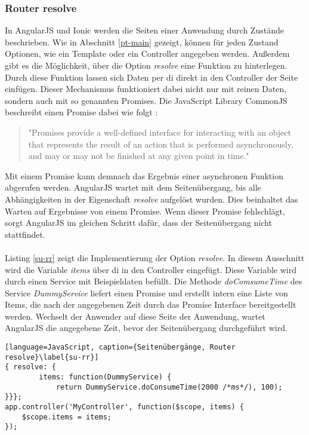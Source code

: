 \subsubsection{Router resolve}
\label{dd-router-resolve}
In AngularJS und Ionic werden die Seiten einer Anwendung durch Zustände beschrieben. Wie in Abschnitt \ref{pt-main} gezeigt, können für jeden Zustand Optionen, wie ein \gls{Template} oder ein Controller angegeben werden. Außerdem gibt es die Möglichkeit, über die Option \emph{resolve} eine Funktion zu hinterlegen. Durch diese Funktion lassen sich Daten per \gls{di} direkt in den Controller der Seite einfügen. Dieser Mechanismus funktioniert dabei nicht nur mit reinen Daten, sondern auch mit so genannten \glspl{Promise}. Die JavaScript Library CommonJS beschreibt einen Promise dabei wie folgt \cite{CommonJSPromises}:
\begin{quote}
"Promises provide a well-defined interface for interacting with an object that represents the result of an action that is performed asynchronously, and may or may not be finished at any given point in time."
\end{quote}
Mit einem \gls{Promise} kann demnach das Ergebnis einer asynchronen Funktion abgerufen werden. AngularJS wartet mit dem Seitenübergang, bis alle Abhängigkeiten in der Eigenschaft \emph{resolve} aufgelöst wurden. Dies beinhaltet das Warten auf Ergebnisse von einem \gls{Promise}. Wenn dieser \gls{Promise} fehlschlägt, sorgt AngularJS im gleichen Schritt dafür, dass der Seitenübergang nicht stattfindet. 
\\\\
Listing \ref{su-rr} zeigt die Implementierung der Option \emph{resolve}. In diesem Ausschnitt wird die Variable \emph{items} über \gls{di} in den Controller eingefügt. Diese Variable wird durch einen Service mit Beispieldaten befüllt. Die Methode \emph{doComsumeTime} des Service \emph{DummyService} liefert einen Promise und erstellt intern eine Liste von Items, die nach der angegebenen Zeit durch das \gls{Promise} Interface bereitgestellt werden. Wechselt der Anwender auf diese Seite der Anwendung, wartet AngularJS die angegebene Zeit, bevor der Seitenübergang durchgeführt wird.
\begin{lstlisting}[language=JavaScript, caption={Seitenübergänge, Router resolve}\label{su-rr}]
{ resolve: {
		items: function(DummyService) {
			return DummyService.doConsumeTime(2000 /*ms*/), 100);
}}};
app.controller('MyController', function($scope, items) {
	$scope.items = items;
});
\end{lstlisting}
